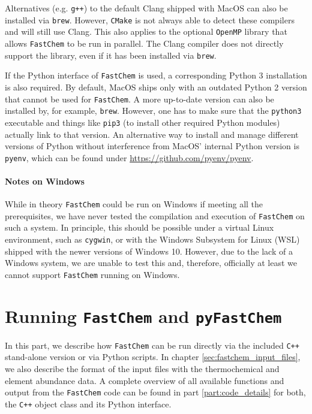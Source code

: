 \documentclass[numbers=noenddot]{aux/fcmanual}
\newcommand{\fc}{\texttt{FastChem}\xspace}
\newcommand{\pfc}{\texttt{pyFastChem}\xspace}
\newcommand{\cpp}{\ttt{C++}\xspace}
\newcommand{\ttt}[1]{\texttt {#1}}
\begin{document}
Alternatives (e.g. \texttt{g++}) to the default Clang shipped with MacOS can also be installed via \texttt{brew}. However, \texttt{CMake} is not always able to detect these compilers and will still use Clang. This also applies to the optional \ttt{OpenMP} library that allows \fc to be run in parallel. The Clang compiler does not directly support the library, even if it has been installed via \texttt{brew}.

If the Python interface of \fc is used, a corresponding Python 3 installation is also required. By default, MacOS ships only with an outdated Python 2 version that cannot be used for \fc. A more up-to-date version can also be installed by, for example, \texttt{brew}. However, one has to make sure that the \texttt{python3} executable and things like \texttt{pip3} (to install other required Python modules) actually link to that version. An alternative way to install and manage different versions of Python without interference from MacOS' internal Python version is \texttt{pyenv}, which can be found under \url{https://github.com/pyenv/pyenv}. 


\subsection{Notes on Windows}

While in theory \fc could be run on Windows if meeting all the prerequisites, we have never tested the compilation and execution of \fc on such a system. In principle, this should be possible under a virtual Linux environment, such as \texttt{cygwin}, or with the Windows Subsystem for Linux (WSL) shipped with the newer versions of Windows 10. However, due to the lack of a Windows system, we are unable to test this and, therefore, officially at least we cannot support \fc running on Windows.


\part{Running \fc and \pfc}
\label{part:running}

In this part, we describe how \fc can be run directly via the included \cpp stand-alone version or via Python scripts. In chapter \ref{sec:fastchem_input_files}, we also describe the format of the input files with the thermochemical and element abundance data. A complete overview of all available functions and output from the \fc code can be found in part \ref{part:code_details} for both, the \cpp object class and its Python interface.
\end{document}
